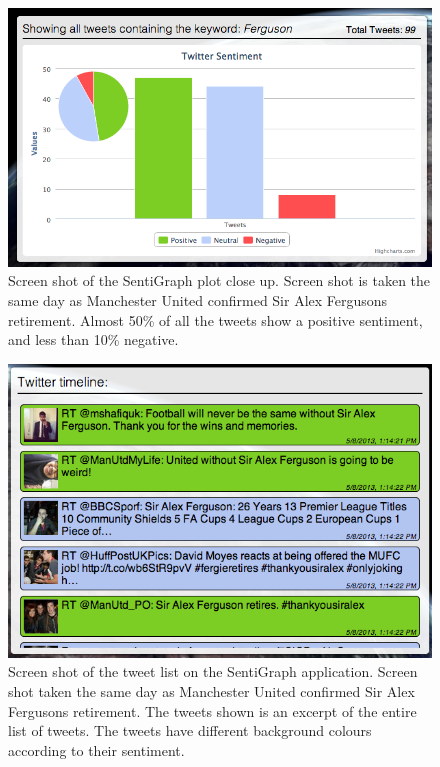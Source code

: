 \begin{figure}[htb!]
\begin{center}
 \includegraphics[width=\textwidth]{../img/sentigraph_1.png}
 \caption[SentiGraph graph view screen shot]{Screen shot of the SentiGraph plot close up. Screen shot is taken the same day as Manchester United confirmed Sir Alex Fergusons retirement. Almost 50\% of all the tweets show a positive sentiment, and less than 10\% negative.}
 \label{fig:sentigraph_1}
\end{center}
\end{figure}

\begin{figure}[htb!]
\begin{center}
 \includegraphics[width=\textwidth]{../img/sentigraph_2.png}
 \caption[SentiGraph tweet list screen shot]{Screen shot of the tweet list on the SentiGraph application. Screen shot taken the same day as Manchester United confirmed Sir Alex Fergusons retirement. The tweets shown is an excerpt of the entire list of tweets. The tweets have different background colours according to their sentiment.}
 \label{fig:sentigraph_2}
\end{center}
\end{figure}


